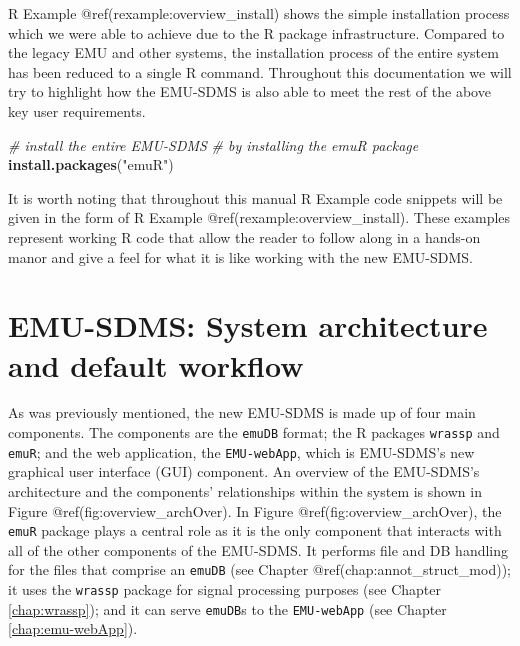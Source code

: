 \documentclass[]{book}
\newenvironment{Shaded}{\begin{snugshade}}{\end{snugshade}}
\newcommand{\KeywordTok}[1]{\textcolor[rgb]{0.13,0.29,0.53}{\textbf{{#1}}}}
\newcommand{\StringTok}[1]{\textcolor[rgb]{0.31,0.60,0.02}{{#1}}}
\newcommand{\CommentTok}[1]{\textcolor[rgb]{0.56,0.35,0.01}{\textit{{#1}}}}
\newcommand{\NormalTok}[1]{{#1}}
\theoremstyle{definition}
\theoremstyle{definition}
\theoremstyle{definition}
\theoremstyle{remark}
\begin{document}
R Example @ref(rexample:overview\_install) shows the simple installation
process which we were able to achieve due to the R package
infrastructure. Compared to the legacy EMU and other systems, the
installation process of the entire system has been reduced to a single R
command. Throughout this documentation we will try to highlight how the
EMU-SDMS is also able to meet the rest of the above key user
requirements.

\begin{Shaded}
\begin{Highlighting}[]
\CommentTok{# install the entire EMU-SDMS}
\CommentTok{# by installing the emuR package}
\KeywordTok{install.packages}\NormalTok{(}\StringTok{"emuR"}\NormalTok{)}
\end{Highlighting}
\end{Shaded}

It is worth noting that throughout this manual R Example code snippets
will be given in the form of R Example @ref(rexample:overview\_install).
These examples represent working R code that allow the reader to follow
along in a hands-on manor and give a feel for what it is like working
with the new EMU-SDMS.

\section{EMU-SDMS: System architecture and default
workflow}\label{emu-sdms-system-architecture-and-default-workflow}

\label{sec:overview_sysArch}

As was previously mentioned, the new EMU-SDMS is made up of four main
components. The components are the \texttt{emuDB} format; the R packages
\texttt{wrassp} and \texttt{emuR}; and the web application, the
\texttt{EMU-webApp}, which is EMU-SDMS's new graphical user interface
(GUI) component. An overview of the EMU-SDMS's architecture and the
components' relationships within the system is shown in Figure
@ref(fig:overview\_archOver). In Figure @ref(fig:overview\_archOver),
the \texttt{emuR} package plays a central role as it is the only
component that interacts with all of the other components of the
EMU-SDMS. It performs file and DB handling for the files that comprise
an \texttt{emuDB} (see Chapter @ref(chap:annot\_struct\_mod)); it uses
the \texttt{wrassp} package for signal processing purposes (see Chapter
\ref{chap:wrassp}); and it can serve \texttt{emuDB}s to the
\texttt{EMU-webApp} (see Chapter \ref{chap:emu-webApp}).
\end{document}

